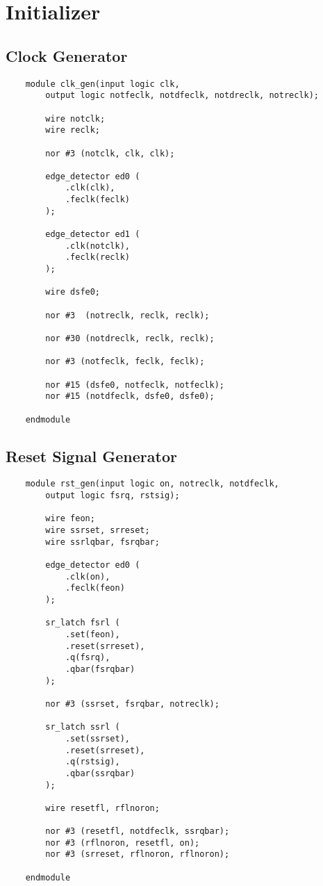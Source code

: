 \documentclass[../main]{subfiles}
\begin{document}
\section{Initializer}

\subsection {Clock Generator}

\begin{verbatim}
    module clk_gen(input logic clk,
        output logic notfeclk, notdfeclk, notdreclk, notreclk);

        wire notclk;
        wire reclk;

        nor #3 (notclk, clk, clk);

        edge_detector ed0 (
            .clk(clk),
            .feclk(feclk)
        );

        edge_detector ed1 (
            .clk(notclk),
            .feclk(reclk)
        );

        wire dsfe0;

        nor #3  (notreclk, reclk, reclk);

        nor #30 (notdreclk, reclk, reclk);

        nor #3 (notfeclk, feclk, feclk);

        nor #15 (dsfe0, notfeclk, notfeclk);
        nor #15 (notdfeclk, dsfe0, dsfe0);

    endmodule
\end{verbatim}

\subsection {Reset Signal Generator}

\begin{verbatim}
    module rst_gen(input logic on, notreclk, notdfeclk,
        output logic fsrq, rstsig);

        wire feon;
        wire ssrset, srreset;
        wire ssrlqbar, fsrqbar;

        edge_detector ed0 (
            .clk(on),
            .feclk(feon)
        );

        sr_latch fsrl (
            .set(feon),
            .reset(srreset),
            .q(fsrq),
            .qbar(fsrqbar)
        );

        nor #3 (ssrset, fsrqbar, notreclk);

        sr_latch ssrl (
            .set(ssrset),
            .reset(srreset),
            .q(rstsig),
            .qbar(ssrqbar)
        );

        wire resetfl, rflnoron;

        nor #3 (resetfl, notdfeclk, ssrqbar);
        nor #3 (rflnoron, resetfl, on);
        nor #3 (srreset, rflnoron, rflnoron);

    endmodule
\end{verbatim}
\end{document}
